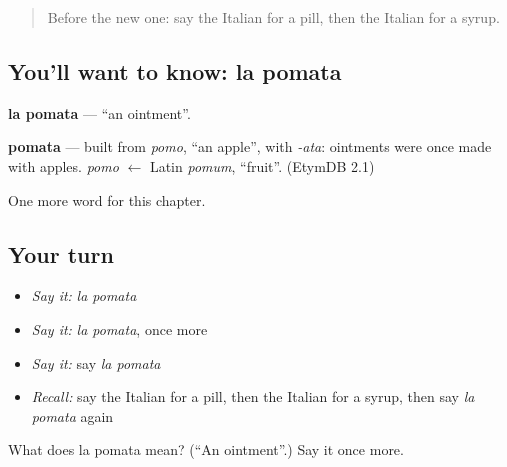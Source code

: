 \begin{quote}
Before the new one: say the Italian for a pill, then the Italian for a syrup.
\end{quote}

\subsection*{You'll want to know: la pomata}
\textbf{la pomata} — \textquotedblleft{}an ointment\textquotedblright{}.

\begin{cousinweb}
\textbf{pomata} — built from \emph{pomo}, \textquotedblleft{}an apple\textquotedblright{}, with \emph{-ata}: ointments were once made with apples. \emph{pomo} $\leftarrow$ Latin \emph{pomum}, \textquotedblleft{}fruit\textquotedblright{}. (EtymDB 2.1)
\end{cousinweb}

\begin{grammarlens}[title={What you've built}]
One more word for this chapter.
\end{grammarlens}

\subsection*{Your turn}
\begin{itemize}
\raggedright
  \item \emph{Say it:} \emph{la pomata}
  \item \emph{Say it:} \emph{la pomata}, once more
  \item \emph{Say it:} say \emph{la pomata}
  \item \emph{Recall:} say the Italian for a pill, then the Italian for a syrup, then say \emph{la pomata} again
\end{itemize}

\begin{tcolorbox}[breakable,colback=teal!4,colframe=teal!35!black,title={Before you move on}]
What does la pomata mean? (\textquotedblleft{}An ointment\textquotedblright{}.) Say it once more.
\end{tcolorbox}
